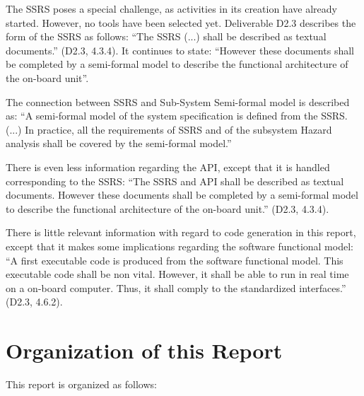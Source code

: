The SSRS poses a special challenge, as activities in its creation have already started.  However, no tools have been selected yet.  Deliverable D2.3 \citep{D2_3} describes the form of the SSRS as follows:
``The SSRS (...) shall be described as textual documents.'' (D2.3, 4.3.4).  It continues to state: ``However these documents shall be completed by a semi-formal model to describe the functional architecture of the on-board unit''.

The connection between SSRS and Sub-System Semi-formal model is described as: ``A semi-formal model of the system specification is defined from the SSRS. (...) In practice, all the requirements of SSRS and of the subsystem Hazard analysis shall be covered by the semi-formal model.''

There is even less information regarding the API, except that it is handled corresponding to the SSRS: ``The SSRS and API shall be described as textual documents. However these documents shall be completed by a semi-formal model to describe the functional architecture of the on-board unit.'' (D2.3, 4.3.4).

There is little relevant information with regard to code generation in this report, except that it makes some implications regarding the software functional model: ``A first executable code is produced from the software functional model.  This executable code shall be non vital. However, it shall be able to run in real time on a on-board computer.  Thus, it shall comply to the standardized interfaces.'' (D2.3, 4.6.2).

\section{Organization of this Report}

This report is organized as follows:

